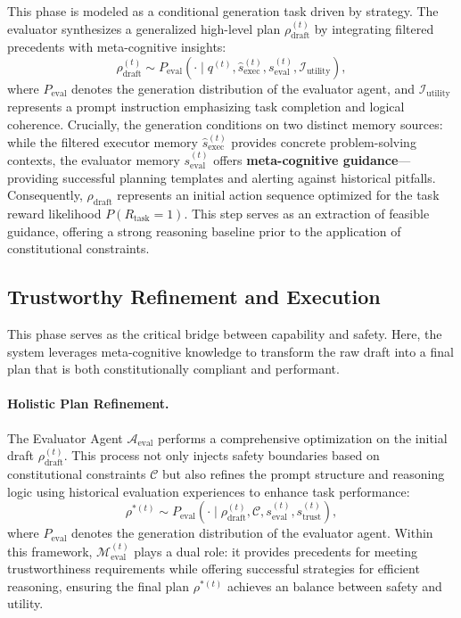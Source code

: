 \documentclass{article}
\theoremstyle{plain}
\theoremstyle{definition}
\theoremstyle{remark}
\begin{document}
This phase is modeled as a conditional generation task driven by strategy. The evaluator synthesizes a generalized high-level plan $\rho_{\text{draft}}^{(t)}$ by integrating filtered precedents with meta-cognitive insights:
\begin{equation}
    \rho_{\text{draft}}^{(t)} \sim P_{\text{eval}}(\cdot \mid q^{(t)}, \hat{s}_{\text{exec}}^{(t)}, s_{\text{eval}}^{(t)}, \mathcal{I}_{\text{utility}}),
\end{equation}
where $P_{\text{eval}}$ denotes the generation distribution of the evaluator agent, and $\mathcal{I}_{\text{utility}}$ represents a prompt instruction emphasizing task completion and logical coherence. Crucially, the generation conditions on two distinct memory sources: while the filtered executor memory $\hat{s}_{\text{exec}}^{(t)}$ provides concrete problem-solving contexts, the evaluator memory $s_{\text{eval}}^{(t)}$ offers \textbf{meta-cognitive guidance}---providing successful planning templates and alerting against historical pitfalls. Consequently, $\rho_{\text{draft}}$ represents an initial action sequence optimized for the task reward likelihood $P(R_{\text{task}}=1)$. This step serves as an extraction of feasible guidance, offering a strong reasoning baseline prior to the application of constitutional constraints.

\subsection{Trustworthy Refinement and Execution}
This phase serves as the critical bridge between capability and safety. Here, the system leverages meta-cognitive knowledge to transform the raw draft into a final plan that is both constitutionally compliant and performant.

\paragraph{Holistic Plan Refinement.} The Evaluator Agent $\mathcal{A}_{\text{eval}}$ performs a comprehensive optimization on the initial draft $\rho^{(t)}_{\text{draft}}$. This process not only injects safety boundaries based on constitutional constraints $\mathcal{C}$ but also refines the prompt structure and reasoning logic using historical evaluation experiences to enhance task performance:
\begin{equation}
    \rho^{*(t)} \sim P_{\text{eval}}(\cdot \mid \rho^{(t)}_{\text{draft}}, \mathcal{C}, s_{\text{eval}}^{(t)},s_{\text{trust}}^{(t)}),
\end{equation}
where $P_{\text{eval}}$ denotes the generation distribution of the evaluator agent. Within this framework, $\mathcal{M}_{\text{eval}}^{(t)}$ plays a dual role: it provides precedents for meeting trustworthiness requirements while offering successful strategies for efficient reasoning, ensuring the final plan $\rho^{*(t)}$ achieves an balance between safety and utility.
\end{document}
